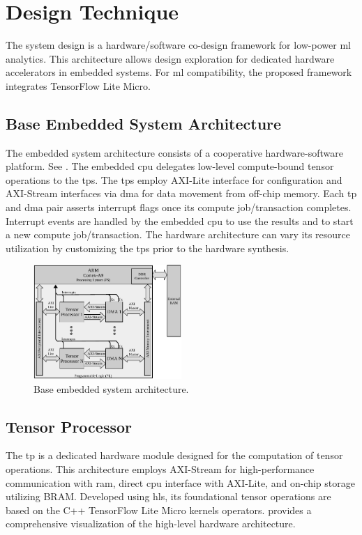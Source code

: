 \section{Design Technique}
\label{sec:system_design}
The system design is a hardware/software co-design framework for low-power \gls{ml} analytics. This architecture allows design exploration for dedicated hardware accelerators in embedded systems. For \gls{ml} compatibility, the proposed framework integrates TensorFlow Lite Micro.

\subsection{Base Embedded System Architecture}
The embedded system architecture consists of a cooperative hardware-software platform. See . The embedded \gls{cpu} delegates low-level compute-bound tensor operations to the \glspl{tp}. The \glspl{tp} employ AXI-Lite interface for configuration and AXI-Stream interfaces via \gls{dma} for data movement from off-chip memory. Each \gls{tp} and \gls{dma} pair asserts interrupt flags once its compute job/transaction completes. Interrupt events are handled by the embedded \gls{cpu} to use the results and to start a new compute job/transaction. The hardware architecture can vary its resource utilization by customizing the \glspl{tp} prior to the hardware synthesis.
\begin{figure}[h!]
	\centering
	\includegraphics[width=0.5\textwidth]{./chapters/cnn_accelerator/figures/system_design.pdf}
	\caption{Base embedded system architecture.}
	\label{fig:system_architecture}
\end{figure}
\FloatBarrier
\subsection{Tensor Processor}
The \gls{tp} is a dedicated hardware module designed for the computation of tensor operations. This architecture employs AXI-Stream for high-performance communication with \gls{ram}, direct \gls{cpu} interface with AXI-Lite, and on-chip storage utilizing BRAM. Developed using \gls{hls}, its foundational tensor operations are based on the C++ TensorFlow Lite Micro kernels operators.   provides a comprehensive visualization of the high-level hardware architecture.

